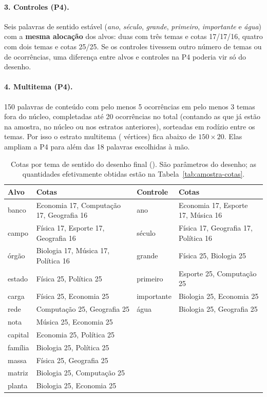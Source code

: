 \paragraph{3. Controles (P4).} Seis palavras de sentido estável (\emph{ano}, \emph{século},
\emph{grande}, \emph{primeiro}, \emph{importante} e \emph{água}) com a \textbf{mesma
alocação} dos alvos: duas com três temas e cotas 17/17/16, quatro com dois temas e cotas
25/25. Se os controles tivessem outro número de temas ou de ocorrências, uma diferença entre
alvos e controles na P4 poderia vir só do desenho.

\paragraph{4. Multitema (P4).} 150 palavras de conteúdo com pelo menos 5 ocorrências em pelo
menos 3 temas fora do núcleo, completadas até 20 ocorrências no total (contando as que já
estão na amostra, no núcleo ou nos estratos anteriores), sorteadas em rodízio entre os temas.
Por isso o estrato multitema (\nVerticesMultitema{} vértices) fica abaixo de $150\times20$.
Elas ampliam a P4 para além das 18 palavras escolhidas à mão.

\begin{table}[htbp]
\centering
\caption{Cotas por tema de sentido do desenho final (). São
parâmetros do desenho; as quantidades efetivamente obtidas estão na
Tabela~\ref{tab:amostra-cotas}.}\label{tab:cotas}
\small
\begin{tabular}{@{}l l@{\hspace{2.5em}}l l@{}}
\toprule
\textbf{Alvo} & \textbf{Cotas} & \textbf{Controle} & \textbf{Cotas} \\
\midrule
banco & Economia 17, Computação 17, Geografia 16 & ano & Economia 17, Esporte 17, Música 16 \\
campo & Física 17, Esporte 17, Geografia 16 & século & Física 17, Geografia 17, Política 16 \\
órgão & Biologia 17, Música 17, Política 16 & grande & Física 25, Biologia 25 \\
estado & Física 25, Política 25 & primeiro & Esporte 25, Computação 25 \\
carga & Física 25, Economia 25 & importante & Biologia 25, Economia 25 \\
rede & Computação 25, Geografia 25 & água & Biologia 25, Geografia 25 \\
nota & Música 25, Economia 25 & & \\
capital & Economia 25, Política 25 & & \\
família & Biologia 25, Política 25 & & \\
massa & Física 25, Geografia 25 & & \\
matriz & Biologia 25, Computação 25 & & \\
planta & Biologia 25, Economia 25 & & \\
\bottomrule
\end{tabular}
\end{table}

